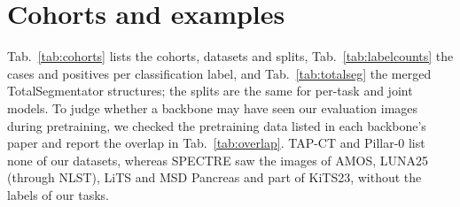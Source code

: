 \clearpage


\clearpage


\clearpage
\section{Cohorts and examples}
\label{app:cohorts}\label{app:data}

Tab.~\ref{tab:cohorts} lists the cohorts, datasets and splits, Tab.~\ref{tab:labelcounts} the cases and positives per classification label, and Tab.~\ref{tab:totalseg} the merged TotalSegmentator structures; the splits are the same for per-task and joint models. To judge whether a backbone may have seen our evaluation images during pretraining, we checked the pretraining data listed in each backbone's paper and report the overlap in Tab.~\ref{tab:overlap}. TAP-CT and Pillar-0 list none of our datasets, whereas SPECTRE saw the images of AMOS, LUNA25 (through NLST), LiTS and MSD Pancreas and part of KiTS23, without the labels of our tasks.

